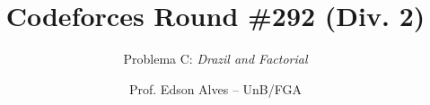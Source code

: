 \title{Codeforces Round \#292 (Div. 2)}
\subtitle{Problema C: \it Drazil and Factorial}
\author{Prof. Edson Alves -- UnB/FGA}
\date{}
